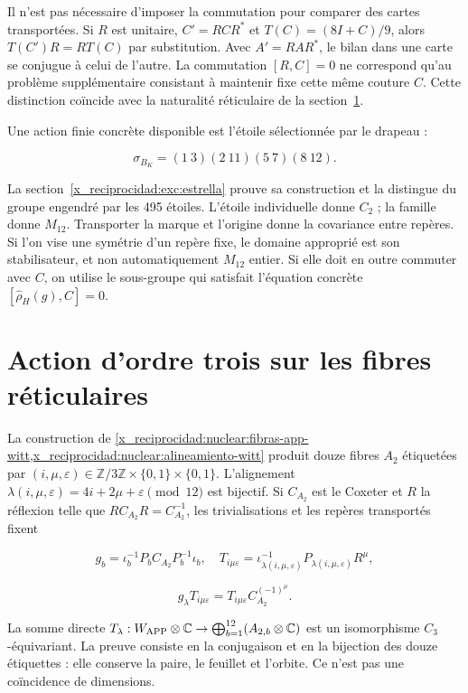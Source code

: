 Il n’est pas nécessaire d’imposer la commutation pour comparer des cartes transportées. Si \(R\) est unitaire, \(C'=RCR^*\) et \(T(C)=(8I+C)/9\), alors \(T(C')R=RT(C)\) par substitution. Avec \(A'=RAR^*\), le bilan dans une carte se conjugue à celui de l’autre. La commutation \([R,C]=0\) ne correspond qu’au problème supplémentaire consistant à maintenir fixe cette même couture \(C\). Cette distinction coïncide avec la naturalité réticulaire de la section~\ref{x_reciprocidad:nuc04:c3}.

Une action finie concrète disponible est l’étoile sélectionnée par le drapeau :

\[
\sigma_{B_K}=(1\ 3)(2\ 11)(5\ 7)(8\ 12).
\]

La section~\ref{x_reciprocidad:exc:estrella} prouve sa construction et la distingue du groupe engendré par les 495 étoiles. L’étoile individuelle donne \(C_2\) ; la famille donne \(M_{12}\). Transporter la marque et l’origine donne la covariance entre repères. Si l’on vise une symétrie d’un repère fixe, le domaine approprié est son stabilisateur, et non automatiquement \(M_{12}\) entier. Si elle doit en outre commuter avec \(C\), on utilise le sous-groupe qui satisfait l’équation concrète \([\widehat\rho_H(g),C]=0\).

\section{Action d’ordre trois sur les fibres réticulaires}\label{x_reciprocidad:nuc04:c3}

La construction de \cref{x_reciprocidad:nuclear:fibras-app-witt,x_reciprocidad:nuclear:alineamiento-witt} produit douze fibres \(A_2\) étiquetées par \((i,\mu,\varepsilon)\in\mathbb Z/3\mathbb Z\times\{0,1\}\times\{0,1\}\). L’alignement \(\lambda(i,\mu,\varepsilon)=4i+2\mu+\varepsilon\pmod{12}\) est bijectif. Si \(C_{A_2}\) est le Coxeter et \(R\) la réflexion telle que \(RC_{A_2}R=C_{A_2}^{-1}\), les trivialisations et les repères transportés fixent

\[
g_b=\iota_b^{-1}P_bC_{A_2}P_b^{-1}\iota_b,
\quad T_{i\mu\varepsilon}=\iota_{\lambda(i,\mu,\varepsilon)}^{-1}P_{\lambda(i,\mu,\varepsilon)}R^\mu,
\]

\[
g_\lambda T_{i\mu\varepsilon}
=T_{i\mu\varepsilon}C_{A_2}^{(-1)^\mu}.
\]

La somme directe \(T_\lambda:W_{\rm APP}\otimes\mathbb C\to\bigoplus_{b=1}^{12}(A_{2,b}\otimes\mathbb C)\) est un isomorphisme \(C_3\)-équivariant. La preuve consiste en la conjugaison et en la bijection des douze étiquettes : elle conserve la paire, le feuillet et l’orbite. Ce n’est pas une coïncidence de dimensions.

